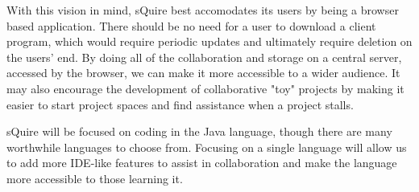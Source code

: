 \documentclass[11pt]{report}
\begin{document}
With this vision in mind, sQuire best accomodates its users by being a browser based application. There should be no need for a user to download a client program, which would require periodic updates and ultimately require deletion on the users' end. By doing all of the collaboration and storage on a central server, accessed by the browser, we can make it more accessible to a wider audience. It may also encourage the development of collaborative "toy" projects by making it easier to start project spaces and find assistance when a project stalls.

sQuire will be focused on coding in the Java language, though there are many worthwhile languages to choose from. Focusing on a single language will allow us to add more IDE-like features to assist in collaboration and make the language more accessible to those learning it.
\end{document}

